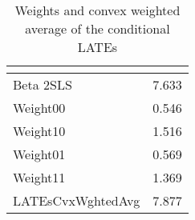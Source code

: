 \begin{table}[htbp]\centering
\caption{Weights and convex weighted average of the conditional LATEs\label{tab:Angrist}}
\begin{tabular}{l*{1}{c}}
\hline\hline
            &\multicolumn{1}{c}{}\\
\hline
Beta 2SLS   &       7.633\\
\hline
Weight00    &       0.546\\
Weight10    &       1.516\\
Weight01    &       0.569\\
Weight11    &       1.369\\
LATEsCvxWghtedAvg&       7.877\\
\hline\hline
\end{tabular}
\end{table}
